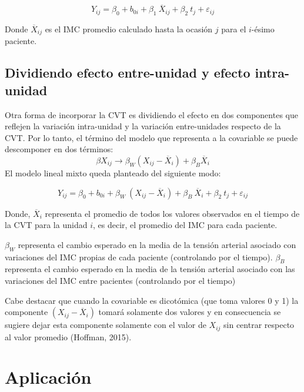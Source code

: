\documentclass[spanish]{article}
\numberwithin{figure}{subsection}
\numberwithin{equation}{subsection}
\numberwithin{table}{subsection}
\begin{document}
\[ Y_{ij} = \beta_0 + b_{0i} + \beta_1\ \overline{X}_{ij} + \beta_2\ t_j + \varepsilon_{ij} \]

Donde $\overline{X}_{ij}$ es el IMC promedio calculado hasta la ocasión $j$ para
el $i$-ésimo paciente.

\subsection{Dividiendo efecto entre-unidad y efecto intra-unidad}
\label{Dividiendo efecto entre-unidad y efecto intra-unidad}

Otra forma de incorporar la CVT es dividiendo el efecto en dos componentes que
reflejen la variación intra-unidad y la variación entre-unidades respecto de la
CVT. Por lo tanto, el término del modelo que representa a la covariable se puede
descomponer en dos términos:
\[ \beta X_{ij} \rightarrow \beta_W (X_{ij} - \overline{X}_i) + \beta_B \overline{X}_i \]
El modelo lineal mixto queda planteado del siguiente modo:


\[ 
	Y_{ij} = \beta_0 + b_{0i} + \beta_W\ (X_{ij} - \overline{X}_i) + \beta_B\ \overline{X}_i
	+ \beta_2\ t_j + \varepsilon_{ij}
\]

Donde, $\overline{X}_i$ representa el promedio de todos los valores observados
en el tiempo de la CVT para la unidad $i$, es decir, el promedio del IMC para
cada paciente.

$\beta_W$ representa el cambio esperado en la media de la tensión arterial
asociado con variaciones del IMC propias de cada paciente (controlando por el
tiempo). $\beta_B$ representa el cambio esperado en la media de la tensión
arterial asociado con las variaciones del IMC entre pacientes (controlando por
el tiempo)

Cabe destacar que cuando la covariable es dicotómica (que toma valores 0 y 1) la
componente $(X_{ij} - \overline{X}_i)$ tomará solamente dos valores y en
consecuencia se sugiere dejar esta componente solamente con el valor de $X_{ij}$
sin centrar respecto al valor promedio (Hoffman, 2015).

\newpage

\section{Aplicación}
\end{document}
